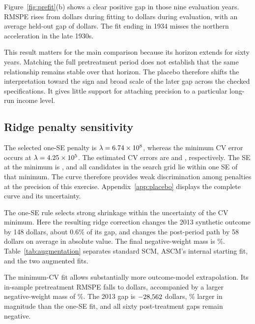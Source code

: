 \documentclass[12pt]{article}
\begin{document}
Figure~\ref{fig:prefit}(b) shows a clear positive gap in those nine evaluation years. RMSPE rises from \PlaceboPre{} dollars during fitting to \PlaceboPost{} dollars during evaluation, with an average held-out gap of \PlaceboHeldoutMean{} dollars. The fit ending in 1934 misses the northern acceleration in the late 1930s.

This result matters for the main comparison because its horizon extends for sixty years. Matching the full pretreatment period does not establish that the same relationship remains stable over that horizon. The placebo therefore shifts the interpretation toward the sign and broad scale of the later gap across the checked specifications. It gives little support for attaching precision to a particular long-run income level.



\subsection{Ridge penalty sensitivity}
The selected one-SE penalty is $\lambda=6.74\times10^{8}$, whereas the minimum CV error occurs at $\lambda=4.25\times10^{5}$. The estimated CV errors are \CVOneSEError{} and \CVMinimumError{}, respectively. The SE at the minimum is \CVMinimumSE{}, and all \CVEligible{} candidates in the search grid lie within one SE of that minimum. The curve therefore provides weak discrimination among penalties at the precision of this exercise. Appendix~\ref{app:placebo} displays the complete curve and its uncertainty.

The one-SE rule selects strong shrinkage within the uncertainty of the CV minimum. Here the resulting ridge correction changes the 2013 synthetic outcome by 148 dollars, about 0.6\% of its gap, and changes the post-period path by 58 dollars on average in absolute value. The final negative-weight mass is \ASCMNegativeMass\%. Table~\ref{tab:augmentation} separates standard SCM, ASCM's internal starting fit, and the two augmented fits.

\begin{table}[htbp]
\centering
\caption{ASCM starting fit and sensitivity to ridge penalty selection}
\label{tab:augmentation}
\small

\caption*{\footnotesize All outcome entries are in 2011 international dollars per capita. Pretreatment RMSPE is an in-sample diagnostic.}
\end{table}

The minimum-CV fit allows substantially more outcome-model extrapolation. Its in-sample pretreatment RMSPE falls to \ASCMMinPreRMSPE{} dollars, accompanied by a larger negative-weight mass of \MinimumNegativeMass\%. The 2013 gap is $-28{,}562$ dollars, \PenaltyGapChange\% larger in magnitude than the one-SE fit, and all sixty post-treatment gaps remain negative.
\end{document}
